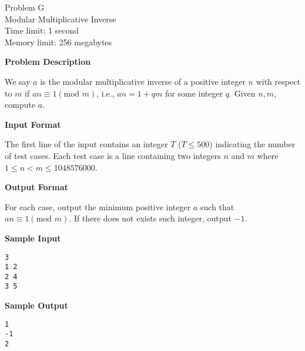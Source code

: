 \documentclass[11pt]{article}
\begin{document}
\begin{center}
    {\LARGE Problem G}\\
    {\Large Modular Multiplicative Inverse}\\
    {Time limit: 1 second}\\
    {Memory limit: 256 megabytes}
\end{center}

\textbf{\large Problem Description}

We say $a$ is the modular multiplicative inverse of a positive integer $n$ 
with respect to $m$ if $an\equiv 1 (\mbox{mod }m)$, i.e., $an=1+qm$ for some
integer $q$. Given $n,m$, compute $a$.

\textbf{\large Input Format}

The first line of the input contains an integer $T$ ($T\le 500$) indicating 
the number of test cases. Each test case is a line containing two integers $n$
and $m$ where $1\le n < m \le 1048576000$.

\textbf{\large Output Format}

For each case, output the minimum positive integer $a$ such that 
$an\equiv 1 (\mbox{mod }m)$. If there does not exists such integer, output
$-1$.

\textbf{\large Sample Input}

\begin{verbatim}
3
1 2
2 4
3 5
\end{verbatim}

\textbf{\large Sample Output}
\begin{verbatim}
1
-1
2
\end{verbatim}
\end{document}
